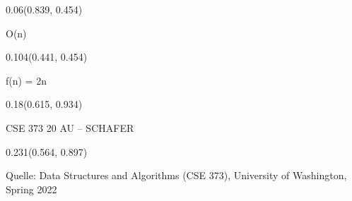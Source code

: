\documentclass[aspectratio=169]{beamer}
\begin{document}
\begin{frame}[fragile]
  \begin{textblock}{0.06}(0.839, 0.454)
    \begin{minipage}[t][0.058\paperheight]{\linewidth}
      O(n)
    \end{minipage}
  \end{textblock}

  \begin{textblock}{0.104}(0.441, 0.454)
    \begin{minipage}[t][0.058\paperheight]{\linewidth}
      f(n) = 2n
    \end{minipage}
  \end{textblock}

  \begin{textblock}{0.18}(0.615, 0.934)
    \begin{minipage}[b][0.032\paperheight]{\linewidth}
      \raggedright
      \fontsize{3}{3.3}\selectfont CSE 373 20 AU – SCHAFER
    \end{minipage}
  \end{textblock}

  \begin{textblock}{0.231}(0.564, 0.897)
    \begin{minipage}[b][0.032\paperheight]{\linewidth}
      \raggedright
      \fontsize{3}{3.3}\selectfont Quelle: Data Structures and Algorithms (CSE 373), University of Washington, Spring 2022
    \end{minipage}
  \end{textblock}
\end{frame}
\end{document}

